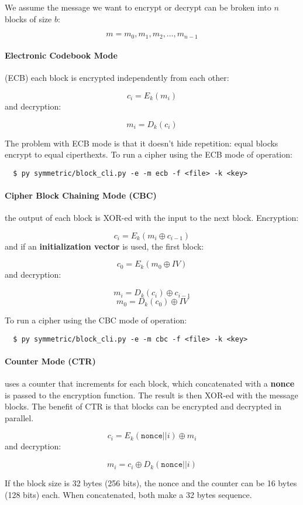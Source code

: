 \documentclass[12pt, letterpaper]{article}
\begin{document}
We assume the message we want to encrypt or decrypt can be broken into $n$ blocks of size $b$:

\[
  m = m_0, m_1, m_2, \dots, m_{n-1}
\]

\paragraph{Electronic Codebook Mode} (ECB) each block is encrypted independently from each other:

\[
  c_i = E_k (m_i)
\]
and decryption:

\[
  m_i = D_k (c_i)
\]

The problem with ECB mode is that it doesn't hide repetition: equal blocks encrypt to equal ciperthexts.
To run a cipher using the ECB mode of operation:

\begin{verbatim}
  $ py symmetric/block_cli.py -e -m ecb -f <file> -k <key>
\end{verbatim}

\paragraph{Cipher Block Chaining Mode (CBC)} the output of each block is XOR-ed with the input to the next block.
Encryption:

\[
  c_i = E_k (m_i \oplus c_{i - 1})
\]
and if an \textbf{initialization vector} is used, the first block:

\[
  c_0 = E_k (m_0 \oplus IV)
\]
and decryption:

\[
  m_i = D_k (c_i) \oplus c_{i-1}
\]
\[
  m_0 = D_k(c_0) \oplus IV
\]

To run a cipher using the CBC mode of operation:

\begin{verbatim}
  $ py symmetric/block_cli.py -e -m cbc -f <file> -k <key>
\end{verbatim}

\paragraph{Counter Mode (CTR)} uses a counter that increments for each block, which concatenated with a \textbf{nonce} is passed to the encryption function.
The result is then XOR-ed with the message blocks.
The benefit of CTR is that blocks can be encrypted and decrypted in parallel.

\[
  c_i = E_k(\mathtt{nonce} || i) \oplus m_i
\]
and decryption:

\[
  m_i = c_i \oplus D_k(\mathtt{nonce} || i)
\]

If the block size is 32 bytes (256 bits), the nonce and the counter can be 16 bytes (128 bits) each.
When concatenated, both make a 32 bytes sequence.
\end{document}
